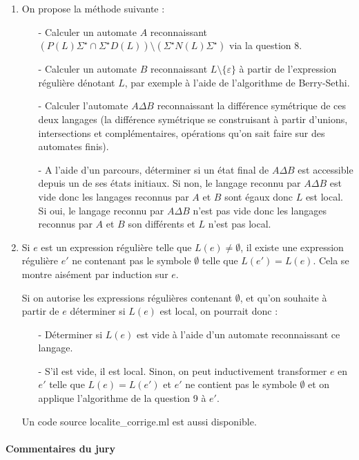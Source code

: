 \documentclass[a4paper, 11pt]{article}
\begin{document}
\begin{enumerate}
\item On propose la méthode suivante : \begin{itemize}
    \item[-] Calculer un automate $A$ reconnaissant $(P(L)\Sigma^{\star} \cap \Sigma^{\star}D(L)) \setminus (\Sigma^{\star}N(L)\Sigma^{\star})$ via la question 8.
    \item[-] Calculer un automate $B$ reconnaissant $L\setminus\{\varepsilon\}$ à partir de l'expression régulière dénotant $L$, par exemple à l'aide de l'algorithme de Berry-Sethi.
    \item[-] Calculer l'automate $A \Delta B$ reconnaissant la différence symétrique de ces deux langages (la différence symétrique se construisant à partir d'unions, intersections et complémentaires, opérations qu'on sait faire sur des automates finis).
    \item[-] A l'aide d'un parcours, déterminer si un état final de $A\Delta B$ est accessible depuis un de ses états initiaux. Si non, le langage reconnu par $A \Delta B$ est vide donc les langages reconnus par $A$ et $B$ sont égaux donc $L$ est local. Si oui, le langage reconnu par $A \Delta B$ n'est pas vide donc les langages reconnus par $A$ et $B$ son différents et $L$ n'est pas local.
\end{itemize}
\item Si $e$ est un expression régulière telle que $L(e) \neq \emptyset$, il existe une expression régulière $e'$ ne contenant pas le symbole $\emptyset$ telle que $L(e') = L(e)$. Cela se montre aisément par induction sur $e$.

Si on autorise les expressions régulières contenant $\emptyset$, et qu'on souhaite à partir de $e$ déterminer si $L(e)$ est local, on pourrait donc : \begin{itemize}
    \item[-] Déterminer si $L(e)$ est vide à l'aide d'un automate reconnaissant ce langage. 
    \item[-] S'il est vide, il est local. Sinon, on peut inductivement transformer $e$ en $e'$ telle que $L(e) = L(e')$ et $e'$ ne contient pas le symbole $\emptyset$ et on applique l'algorithme de la question 9 à $e'$.
\end{itemize}

Un code source \textsf{localite\_corrige.ml} est aussi disponible.

\end{enumerate}


\paragraph{Commentaires du jury}
\end{document}
